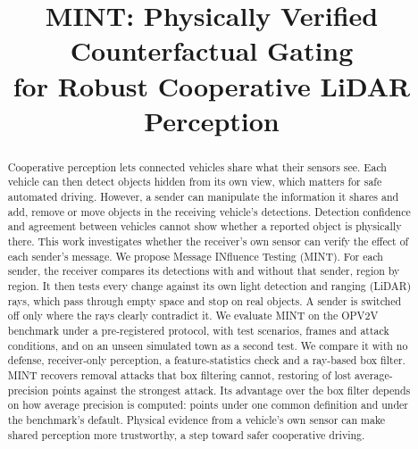 \documentclass[conference]{IEEEtran}
\newcommand{\mint}{MINT}
\begin{document}
\title{\mint: Physically Verified Counterfactual Gating\\ for Robust Cooperative LiDAR Perception}

\author{
}

\maketitle

\begin{abstract}
Cooperative perception lets connected vehicles share what their sensors see. Each vehicle can then detect
objects hidden from its own view, which matters for safe automated driving. However, a sender can manipulate the
information it shares and add, remove or move objects in the receiving vehicle's detections. Detection confidence
and agreement between vehicles cannot show whether a reported object is physically there. This work investigates
whether the receiver's own sensor can verify the effect of each sender's message. We propose Message INfluence
Testing (MINT). For each sender, the receiver compares its detections with and without that sender, region by
region. It then tests every change against its own light detection and ranging (LiDAR) rays, which pass through
empty space and stop on real objects. A sender is switched off only where the rays clearly contradict it. We
evaluate MINT on the OPV2V benchmark under a pre-registered protocol, with \TestScenarios{} test scenarios,
\TestFrames{} frames and \NumConditions{} attack conditions, and on an unseen simulated town as a second test. We
compare it with no defense, receiver-only perception, a feature-statistics check and a ray-based box filter.
MINT recovers removal attacks that box filtering cannot, restoring \RestoredGlobPgdRemStStrongMINT{} of
\LossGlobPgdRemStStrong{} lost average-precision points against the strongest attack. Its advantage over the box
filter depends on how average precision is computed: \VGlobRmB{} points under one common definition and
\VFrameRmB{} under the benchmark's default. Physical evidence from a vehicle's own sensor can make shared
perception more trustworthy, a step toward safer cooperative driving.
\end{abstract}
\end{document}
